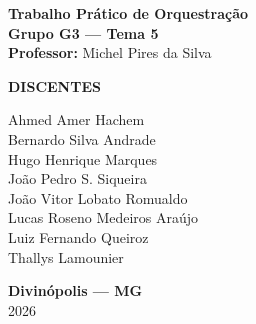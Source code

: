 \documentclass[11pt,a4paper]{article}
\begin{document}
\begin{titlepage}
\vspace{0.7cm}

{\normalsize
\textbf{Trabalho Prático de Orquestração}\\[0.2cm]
\textbf{Grupo G3 --- Tema 5}\\[0.3cm]
\textbf{Professor:} Michel Pires da Silva\par}

\vfill

{\normalsize\bfseries
DISCENTES\par}

\vspace{0.3cm}

{\fontsize{10.5}{15}\selectfont
Ahmed Amer Hachem\\
Bernardo Silva Andrade\\
Hugo Henrique Marques\\
João Pedro S. Siqueira\\
João Vitor Lobato Romualdo\\
Lucas Roseno Medeiros Araújo\\
Luiz Fernando Queiroz\\
Thallys Lamounier\par}

\vfill

{\normalsize
\textbf{Divinópolis --- MG}\\
2026\par}

\vspace{0.3cm}

\end{titlepage}

\hypersetup{pageanchor=true}


\hypersetup{pageanchor=true}
\tableofcontents\clearpage






\end{document}
